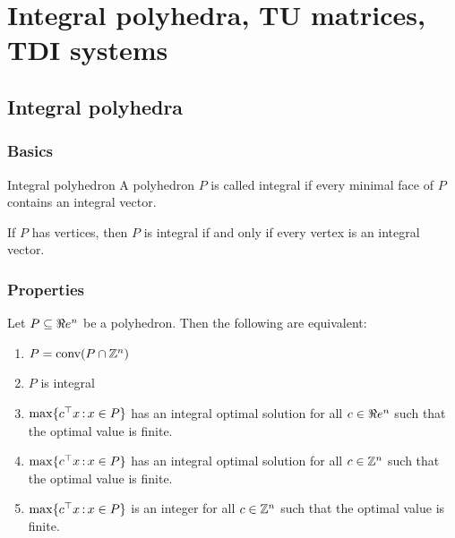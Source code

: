 

%
%
%
%

\chapter{Integral polyhedra, TU matrices, TDI systems}

\section{Integral polyhedra}
 \subsection{Basics}
\begin{definition}{Integral polyhedron}{}
A polyhedron $P$ is called integral if every minimal face of $P$ contains an integral vector.
\end{definition}


\begin{remark}{}{} If $P$ has vertices, then $P$ is integral if and only if every vertex is an integral vector.
\end{remark}

 \subsection{Properties}

\begin{theorem}{}{} Let $P\subseteq\Re e^n$ be a polyhedron. Then the following are equivalent:
\begin{enumerate}
	\item $P=\textup{conv}(P\cap{\mathbb{Z}}^n)$
	\item $P$ is integral
	\item $\max\{c^\top x{\,:\,} x\in P\}$ has an integral optimal solution for all $c\in\Re e^n$ such that the optimal value is finite.
	\item $\max\{c^\top x{\,:\,} x\in P\}$ has an integral optimal solution for all $c\in{\mathbb{Z}}^n$ such that the optimal value is finite.
	\item  $\max\{c^\top x{\,:\,} x\in P\}$ is an integer for all $c\in{\mathbb{Z}}^n$ such that the optimal value is finite.
\end{enumerate}
\end{theorem}


